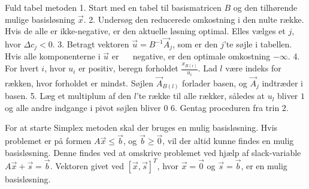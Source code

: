 \begin{pro} [label=pro:simplex,numbers=none,xleftmargin=0em] {Fuld tabel metoden}
1. Start med en tabel til basismatricen $B$ og den tilhørende mulige basisløsning $\vec{x}$.
2. Undersøg den reducerede omkostning i den nulte række. Hvis de alle er ikke-negative, er den aktuelle løsning optimal. Elles vælges et $j$, hvor $\Delta c_j <0$.
3. Betragt vektoren $\vec{u}=B^{-1}\vec{A}_j$, som er den $j$'te søjle i tabellen. Hvis alle komponenterne i $\vec{u}$ er $\quad$ negative, er den optimale omkostning $-\infty$.
4. For hvert $i$, hvor $u_i$ er positiv, beregn forholdet $\frac{x_{B(i)}}{u_i}$. Lad $l$ være indeks for rækken, hvor forholdet er mindst. Søjlen $\vec{A}_{B(l)}$ forlader basen, og $\vec{A}_j$ indtræder i basen. 
5. Læg et multiplum af den $l$'te række til alle rækker, således at $u_l$ bliver $1$ og alle andre indgange i pivot søjlen bliver $0$
6. Gentag proceduren fra trin $2$. 
\end{pro}
For at starte Simplex metoden skal der bruges en mulig basisløsning. Hvis problemet er på formen $A\vec{x} \leq \vec{b}$, og $\vec{b} \geq \vec{0}$, vil der altid kunne findes en mulig basisløsning. Denne findes ved at omskrive problemet ved hjælp af slack-variable $A\vec{x} +\vec{s}= \vec{b}$. Vektoren givet ved $[\vec{x},\vec{s}]^T$, hvor $\vec{x}=\vec{0}$ og $\vec{s}=\vec{b}$, er en mulig basisløsning. 
